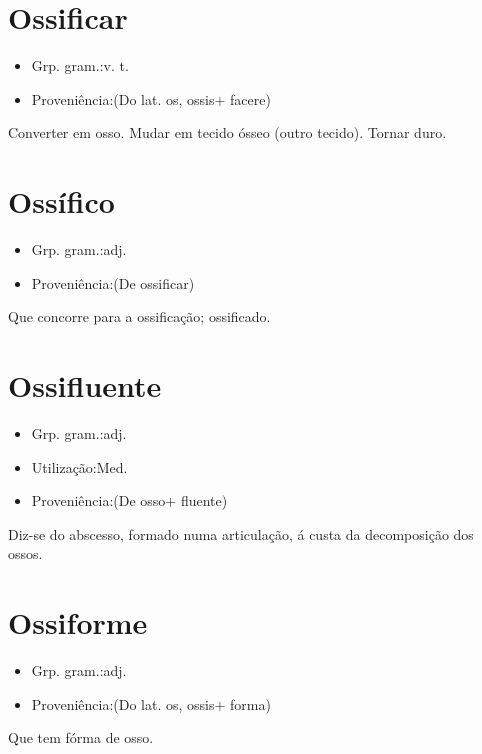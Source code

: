 \section{Ossificar}
\begin{itemize}
\item {Grp. gram.:v. t.}
\end{itemize}
\begin{itemize}
\item {Proveniência:(Do lat. \textunderscore os\textunderscore , \textunderscore ossis\textunderscore  + \textunderscore facere\textunderscore )}
\end{itemize}
Converter em osso.
Mudar em tecido ósseo (outro tecido).
Tornar duro.
\section{Ossífico}
\begin{itemize}
\item {Grp. gram.:adj.}
\end{itemize}
\begin{itemize}
\item {Proveniência:(De \textunderscore ossificar\textunderscore )}
\end{itemize}
Que concorre para a ossificação; ossificado.
\section{Ossifluente}
\begin{itemize}
\item {Grp. gram.:adj.}
\end{itemize}
\begin{itemize}
\item {Utilização:Med.}
\end{itemize}
\begin{itemize}
\item {Proveniência:(De \textunderscore osso\textunderscore  + \textunderscore fluente\textunderscore )}
\end{itemize}
Diz-se do abscesso, formado numa articulação, á custa da decomposição dos ossos.
\section{Ossiforme}
\begin{itemize}
\item {Grp. gram.:adj.}
\end{itemize}
\begin{itemize}
\item {Proveniência:(Do lat. \textunderscore os\textunderscore , \textunderscore ossis\textunderscore  + \textunderscore forma\textunderscore )}
\end{itemize}
Que tem fórma de osso.
